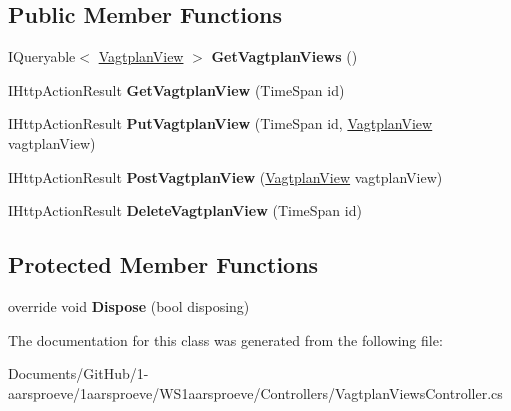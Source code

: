 \subsection*{Public Member Functions}
\begin{DoxyCompactItemize}
\item 
\hypertarget{class_w_s1aarsproeve_1_1_controllers_1_1_vagtplan_views_controller_a0d18b0d8f0a1aa1c17e8e730e094ad06}{}I\+Queryable$<$ \hyperlink{class_w_s1aarsproeve_1_1_vagtplan_view}{Vagtplan\+View} $>$ {\bfseries Get\+Vagtplan\+Views} ()\label{class_w_s1aarsproeve_1_1_controllers_1_1_vagtplan_views_controller_a0d18b0d8f0a1aa1c17e8e730e094ad06}

\item 
\hypertarget{class_w_s1aarsproeve_1_1_controllers_1_1_vagtplan_views_controller_a4c9b09e65670ec7a5ddf9bcd7613c693}{}I\+Http\+Action\+Result {\bfseries Get\+Vagtplan\+View} (Time\+Span id)\label{class_w_s1aarsproeve_1_1_controllers_1_1_vagtplan_views_controller_a4c9b09e65670ec7a5ddf9bcd7613c693}

\item 
\hypertarget{class_w_s1aarsproeve_1_1_controllers_1_1_vagtplan_views_controller_a90d83b2984b07010eb858adfcaae4b83}{}I\+Http\+Action\+Result {\bfseries Put\+Vagtplan\+View} (Time\+Span id, \hyperlink{class_w_s1aarsproeve_1_1_vagtplan_view}{Vagtplan\+View} vagtplan\+View)\label{class_w_s1aarsproeve_1_1_controllers_1_1_vagtplan_views_controller_a90d83b2984b07010eb858adfcaae4b83}

\item 
\hypertarget{class_w_s1aarsproeve_1_1_controllers_1_1_vagtplan_views_controller_ae6ab265152c4d7c74e0e62f20e72dfaa}{}I\+Http\+Action\+Result {\bfseries Post\+Vagtplan\+View} (\hyperlink{class_w_s1aarsproeve_1_1_vagtplan_view}{Vagtplan\+View} vagtplan\+View)\label{class_w_s1aarsproeve_1_1_controllers_1_1_vagtplan_views_controller_ae6ab265152c4d7c74e0e62f20e72dfaa}

\item 
\hypertarget{class_w_s1aarsproeve_1_1_controllers_1_1_vagtplan_views_controller_a7e82602831e3368aa902528d9a2c22f4}{}I\+Http\+Action\+Result {\bfseries Delete\+Vagtplan\+View} (Time\+Span id)\label{class_w_s1aarsproeve_1_1_controllers_1_1_vagtplan_views_controller_a7e82602831e3368aa902528d9a2c22f4}

\end{DoxyCompactItemize}
\subsection*{Protected Member Functions}
\begin{DoxyCompactItemize}
\item 
\hypertarget{class_w_s1aarsproeve_1_1_controllers_1_1_vagtplan_views_controller_abdf1f4f80754be3b6e925f9800502454}{}override void {\bfseries Dispose} (bool disposing)\label{class_w_s1aarsproeve_1_1_controllers_1_1_vagtplan_views_controller_abdf1f4f80754be3b6e925f9800502454}

\end{DoxyCompactItemize}


The documentation for this class was generated from the following file\+:\begin{DoxyCompactItemize}
\item 
Documents/\+Git\+Hub/1-\/aarsproeve/1aarsproeve/\+W\+S1aarsproeve/\+Controllers/Vagtplan\+Views\+Controller.\+cs\end{DoxyCompactItemize}
